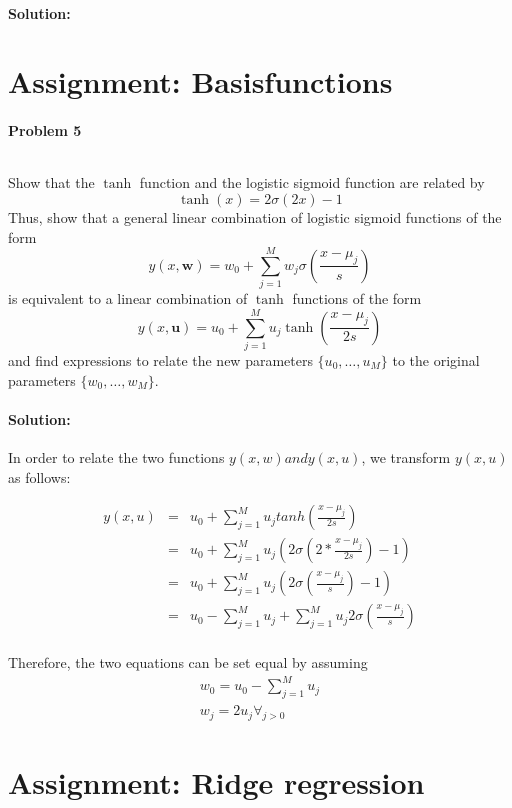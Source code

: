 \documentclass{article}
\renewcommand{\Vec}[1]{\ensuremath{\mathbf{#1}}}
\begin{document}
\paragraph*{Solution:}





\section{Assignment: Basisfunctions }
\paragraph*{Problem 5}
$\;$ 

Show that the $\tanh$ function and the logistic sigmoid function are related
by 
\[
\tanh(x) = 2\sigma(2x) - 1
\]
Thus, show that a general linear combination of logistic sigmoid functions
of the form
\[
y(x, \Vec{w}) = w_0 + \sum_{j=1}^{M} w_j \sigma\left(\frac{x - \mu_j}{s}\right)
\]
is equivalent to a linear combination of $\tanh$ functions of the form
\[
y(x, \Vec{u}) = u_0 + \sum_{j=1}^{M} u_j \tanh\left(\frac{x - \mu_j}{2s}\right)
\]
and find expressions to relate the new parameters $\{u_0, \dots, u_M\}$ to 
the original parameters $\{w_0, \dots, w_M \}$.

\paragraph*{Solution:}

In order to relate the two functions $y(x,w) and y(x,u)$, we transform $y(x,u)$ as follows:

\begin{eqnarray}
y(x,u) &=& u_0 + \sum_{j=1}^M u_j tanh(\frac{x-\mu_j}{2s}) \\
&=& u_0 + \sum_{j=1}^M u_j (2 \sigma(2*\frac{x-\mu_j}{2s}) -1) \\
&=& u_0 + \sum_{j=1}^M u_j (2 \sigma(\frac{x-\mu_j}{s})-1) \\
&=& u_0  - \sum_{j=1}^M u_j + \sum_{j=1}^M u_j 2 \sigma(\frac{x-\mu_j}{s}) \\
\end{eqnarray}

Therefore, the two equations can be set equal by assuming 
\begin{eqnarray}
w_0 = u_0 - \sum_{j=1}^M u_j \\
w_j = 2 u_j \forall_{j>0}
\end{eqnarray}

\section{Assignment: Ridge regression }
\end{document}
